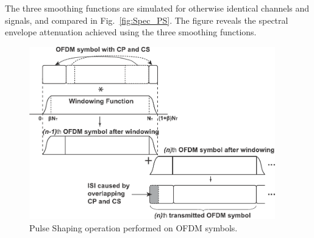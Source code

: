 The three smoothing functions are simulated for otherwise identical channels and signals, and compared in Fig.~\ref{fig:Spec_PS}. The figure reveals the spectral envelope attenuation achieved using the three smoothing functions. %

\begin{figure}[t]
    \centerline{\includegraphics [width=0.9\columnwidth, height=7.5cm] {Figures/w-ofdm} }
	\vspace{-2mm}
    \caption{Pulse Shaping operation performed on OFDM symbols.}
    \label{fig:PS}
\end{figure}


